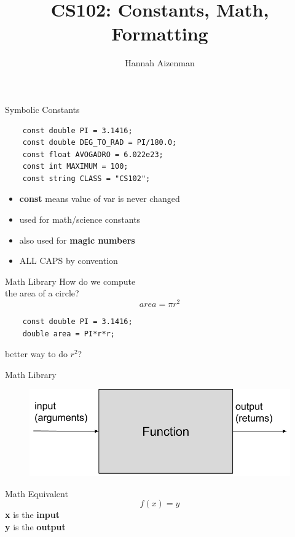 \documentclass[xcolor={dvipsnames}]{beamer}
\begin{document}
\title{ CS102: Constants, Math, Formatting}
\author{Hannah Aizenman}

\begin{frame}
	\titlepage
\end{frame}

\begin{frame}[fragile]{Symbolic Constants}
\center
\begin{verbatim}
	const double PI = 3.1416;
	const double DEG_TO_RAD = PI/180.0;
	const float AVOGADRO = 6.022e23;
	const int MAXIMUM = 100;
	const string CLASS = "CS102";
\end{verbatim}

\begin{block}{}
	\begin{itemize}
		\item \textbf{const} means value of var is never changed
		\item used for math/science constants
		\item also used for \textbf{magic numbers}
		\item ALL CAPS by convention
	\end{itemize}
\end{block}
\end{frame}

\begin{frame}[fragile]{Math Library}
	\center
	\huge How do we compute \\the area of a circle? 
	\pause
	\begin{equation*}
	area = \pi r^2
	\end{equation*}
	\pause
	\begin{verbatim}
	const double PI = 3.1416;
	double area = PI*r*r;
	\end{verbatim}
	\pause
	\vspace{.5cm}
	\begin{center} 
	better way to do $r^2$?
	\end{center}
\end{frame}



\begin{frame}{Math Library}
\begin{figure}
	\includegraphics[width=1\textwidth]{function}
\end{figure}
\pause
\begin{block}{Math Equivalent}
\begin{equation*}
	f(x) = y
\end{equation*}
\center
\textbf{x} is the \textbf{input}\\
\textbf{y} is the \textbf{output}
\end{block}
\end{frame}
\end{document}
